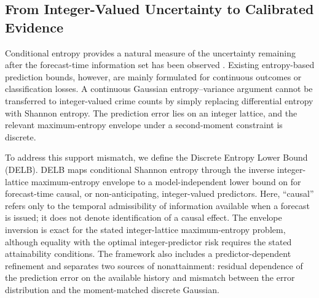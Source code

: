 
\subsection{From Integer-Valued Uncertainty to Calibrated Evidence}
\label{subsec:intro_calibrated_evidence}

Conditional entropy provides a natural measure of the uncertainty remaining
after the forecast-time information set has been observed
\citep{shannon1948,cover_thomas}. Existing entropy-based prediction bounds,
however, are mainly formulated for continuous outcomes or classification
losses. A continuous Gaussian entropy--variance argument cannot be transferred
to integer-valued crime counts by simply replacing differential entropy with
Shannon entropy. The prediction error lies on an integer lattice, and the
relevant maximum-entropy envelope under a second-moment constraint is
discrete.

To address this support mismatch, we define the Discrete Entropy Lower
Bound (DELB). DELB maps conditional Shannon entropy through the inverse
integer-lattice maximum-entropy envelope to a model-independent lower bound on
 for forecast-time causal, or
non-anticipating, integer-valued predictors. Here, ``causal'' refers only to the temporal
admissibility of information available when a forecast is issued; it does not
denote identification of a causal effect. The envelope inversion is exact for
the stated integer-lattice maximum-entropy problem, although equality with
the optimal integer-predictor risk requires the stated attainability
conditions. The framework also includes a predictor-dependent refinement and
separates two sources of nonattainment: residual dependence of the prediction
error on the available history and mismatch between the error distribution
and the moment-matched discrete Gaussian.

